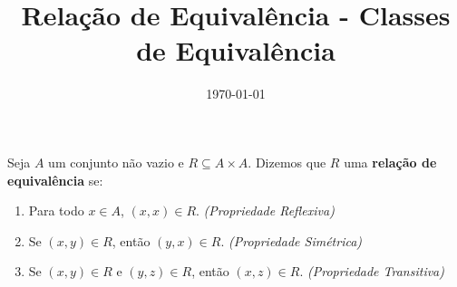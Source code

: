 \documentclass{beamer}
\title{Rela\c{c}\~ao de Equival\^encia - Classes de Equivalência}
\author[\autor]{\autor}
\institute[\instituto]{\instituto}
\date{\today}
\begin{document}
    \begin{frame}
        \maketitle
    \end{frame}


    \begin{frame}
        \begin{definicao}
            Seja $A$ um conjunto n{\~a}o vazio \pause e $R\subseteq A \times A$. \pause Dizemos que $R$  uma \textbf{rela{\c c}{\~a}o de equival{\^e}ncia} se:\pause
            \begin{enumerate}[label={\roman*})]
                \item Para todo $x \in A$, \pause $(x,x) \in R$. \pause \textit{(Propriedade Reflexiva)}\pause
                \item Se $(x, y) \in R$, \pause ent\~ao $(y, x) \in R$. \pause \textit{(Propriedade Sim\'etrica)}\pause
                \item Se $(x, y) \in R$ \pause e $(y, z) \in R$, \pause ent\~ao $(x, z)\in R$. \pause \textit{(Propriedade Transitiva)}\pause
            \end{enumerate}
        \end{definicao}
    \end{frame}
\end{document}
